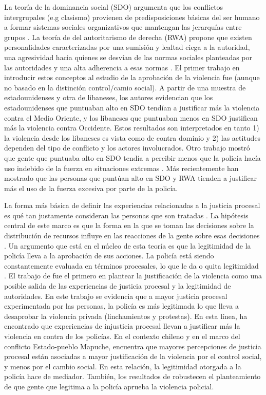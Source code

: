 \documentclass[12pt,twoside]{templates/facsothesis}
\begin{document}
La teoría de la dominancia social (SDO) argumenta que los conflictos intergrupales (e.g clasismo) provienen de predisposiciones básicas del ser humano a formar sistemas sociales organizativos que mantengan las jerarquías entre grupos \citep{Sidanius1999}. La teoría de del autoritarismo de derecha (RWA) propone que existen personalidades caracterizadas por una sumisión y lealtad ciega a la autoridad, una agresividad hacia quienes se desvían de las normas sociales planteadas por las autoridades y una alta adherencia a esas normas \citep{Altemeyer1988}. El primer trabajo en introducir estos conceptos al estudio de la aprobación de la violencia fue \citet{Henry2005} (aunque no basado en la distinción control/camio social). A partir de una muestra de estadounidenses y otra de libaneses, los autores evidencian que los estadounidenses que puntuaban alto en SDO tendían a justificar más la violencia contra el Medio Oriente, y los libaneses que puntuaban menos en SDO justifican más la violencia contra Occidente. Estos resultados son interpretados en tanto 1) la violencia desde los libaneses es vista como de contra dominio y 2) las actitudes dependen del tipo de conflicto y los actores involucrados. Otro trabajo mostró que gente que puntuaba alto en SDO tendía a percibir menos que la policía hacía uso indebido de la fuerza en situaciones extremas \citep{Perkins2006}. Más recientemente \citet{Gerber2017b} han mostrado que las personas que puntúan alto en SDO y RWA tienden a justificar más el uso de la fuerza excesiva por parte de la policía.

La forma más básica de definir las experiencias relacionadas a la justicia procesal es qué tan justamente consideran las personas que son tratadas \citep{Gonzales2007, Vermunt2016}. La hipótesis central de este marco es que la forma en la que se toman las decisiones sobre la distribución de recursos influye en las reacciones de la gente sobre esas decisiones \citep{Vermunt2016}. Un argumento que está en el núcleo de esta teoría es que la legitimidad de la policía lleva a la aprobación de sus acciones. La policía está siendo constantemente evaluada en términos procesales, lo que le da o quita legitimidad \citep{Bradford2017}. El trabajo de \citet{Jackson2013} fue el primero en plantear la justificación de la violencia como una posible salida de las experiencias de justicia procesal y la legitimidad de autoridades. En este trabajo se evidencia que a mayor justicia procesal experimentada por las personas, la policía es más legitimada lo que lleva a desaprobar la violencia privada (linchamientos y protestas). En esta línea, \citet{Maguire2016} ha encontrado que experiencias de injusticia procesal llevan a justificar más la violencia en contra de los policías. En el contexto chileno y en el marco del conflicto Estado-pueblo Mapuche, \citet{Gerber2017} encuentra que mayores percepciones de justicia procesal están asociadas a mayor justificación de la violencia por el control social, y menos por el cambio social. En esta relación, la legitimidad otorgada a la policía hace de mediador. También, los resultados de \citet{Bradford2017} robustecen el planteamiento de que gente que legitima a la policía aprueba la violencia policial.
\end{document}
